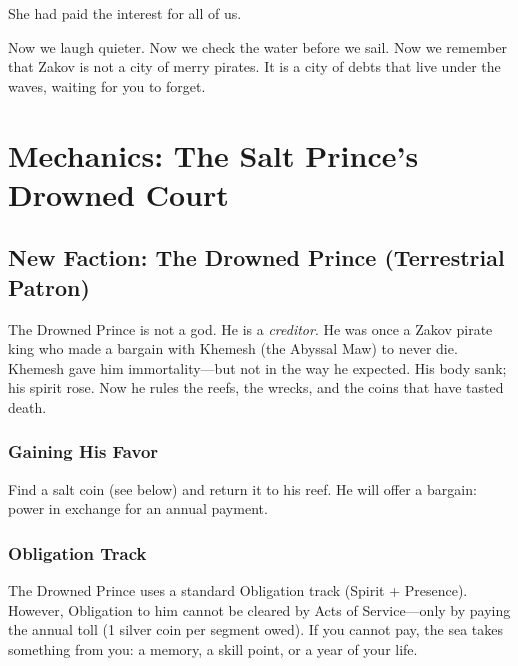\documentclass[12pt]{article}
\begin{document}
She had paid the interest for all of us.

Now we laugh quieter. Now we check the water before we sail. Now we remember that Zakov is not a city of merry pirates. It is a city of debts that live under the waves, waiting for you to forget.

\section*{Mechanics: The Salt Prince's Drowned Court}
\label{sec:mechanics}

\subsection{New Faction: The Drowned Prince (Terrestrial Patron)}
The Drowned Prince is not a god. He is a \textit{creditor}. He was once a Zakov pirate king who made a bargain with Khemesh (the Abyssal Maw) to never die. Khemesh gave him immortality---but not in the way he expected. His body sank; his spirit rose. Now he rules the reefs, the wrecks, and the coins that have tasted death.

\subsubsection{Gaining His Favor}
Find a salt coin (see below) and return it to his reef. He will offer a bargain: power in exchange for an annual payment.

\subsubsection{Obligation Track}
The Drowned Prince uses a standard Obligation track (Spirit + Presence). However, Obligation to him cannot be cleared by Acts of Service---only by paying the annual toll (1 silver coin per segment owed). If you cannot pay, the sea takes something from you: a memory, a skill point, or a year of your life.
\end{document}

